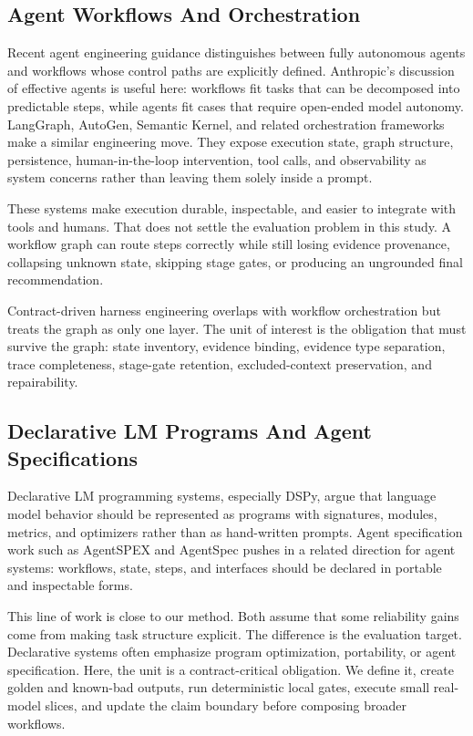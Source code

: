 \documentclass[11pt]{article}
\begin{document}
\subsection{Agent Workflows And Orchestration}

Recent agent engineering guidance distinguishes between fully autonomous agents and workflows whose control paths are explicitly defined. Anthropic's discussion of effective agents is useful here: workflows fit tasks that can be decomposed into predictable steps, while agents fit cases that require open-ended model autonomy. LangGraph, AutoGen, Semantic Kernel, and related orchestration frameworks make a similar engineering move. They expose execution state, graph structure, persistence, human-in-the-loop intervention, tool calls, and observability as system concerns rather than leaving them solely inside a prompt. \cite{P2_EXT_ANTHROPIC,P2_EXT_LANGGRAPH,P2_EXT_AUTOGEN,P2_EXT_SEMANTIC_KERNEL}

These systems make execution durable, inspectable, and easier to integrate with tools and humans. That does not settle the evaluation problem in this study. A workflow graph can route steps correctly while still losing evidence provenance, collapsing unknown state, skipping stage gates, or producing an ungrounded final recommendation.

Contract-driven harness engineering overlaps with workflow orchestration but treats the graph as only one layer. The unit of interest is the obligation that must survive the graph: state inventory, evidence binding, evidence type separation, trace completeness, stage-gate retention, excluded-context preservation, and repairability.

\subsection{Declarative LM Programs And Agent Specifications}

Declarative LM programming systems, especially DSPy, argue that language model behavior should be represented as programs with signatures, modules, metrics, and optimizers rather than as hand-written prompts. Agent specification work such as AgentSPEX and AgentSpec pushes in a related direction for agent systems: workflows, state, steps, and interfaces should be declared in portable and inspectable forms. \cite{P2_EXT_DSPY,P2_EXT_AGENTSPEX,P2_EXT_AGENTSPEC}

This line of work is close to our method. Both assume that some reliability gains come from making task structure explicit. The difference is the evaluation target. Declarative systems often emphasize program optimization, portability, or agent specification. Here, the unit is a contract-critical obligation. We define it, create golden and known-bad outputs, run deterministic local gates, execute small real-model slices, and update the claim boundary before composing broader workflows.
\end{document}
